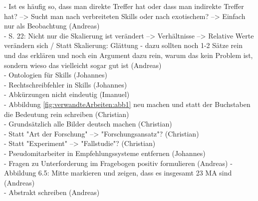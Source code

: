 - Ist es häufig so, dass man direkte Treffer hat oder dass man indirekte Treffer hat? --> Sucht man nach verbreiteten Skills oder nach exotischem? --> Einfach nur als Beobachtung (Andreas)\\
- S. 22: Nicht nur die Skalierung ist verändert --> Verhältnisse --> Relative Werte verändern sich / Statt Skalierung: Glättung - dazu sollten noch 1-2 Sätze rein und das erklären und noch ein Argument dazu rein, warum das kein Problem ist, sondern wieso das vielleicht sogar gut ist (Andreas)\\
- Ontologien für Skills (Johannes)\\
- Rechtschreibfehler in Skills (Johannes)\\
- Abkürzungen nicht eindeutig (Imanuel)\\
- Abbildung \ref{fig:verwandteArbeiten:abb1} neu machen und statt der Buchstaben die Bedeutung rein schreiben (Christian)\\
- Grundsätzlich alle Bilder deutsch machen (Christian)\\
- Statt "Art der Forschung" --> "Forschungsansatz"? (Christian)\\
- Statt "Experiment" --> "Fallstudie"? (Christian)\\
- Pseudomitarbeiter in Empfehlungssysteme entfernen (Johannes)\\
- Fragen zu Unterforderung im Fragebogen positiv formulieren (Andreas)
- Abbildung 6.5: Mitte markieren und zeigen, dass es insgesamt 23 MA sind (Andreas)\\
- Abstrakt schreiben (Andreas)
